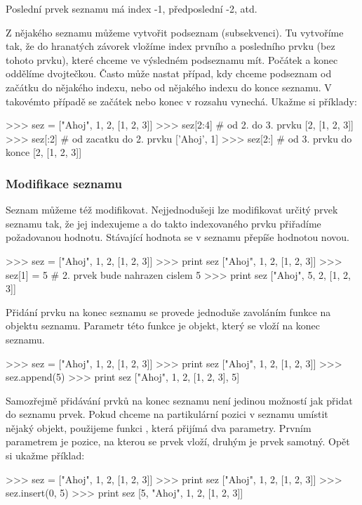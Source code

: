 Poslední prvek seznamu má index -1, předposlední -2, atd.

Z nějakého seznamu můžeme vytvořit podseznam (subsekvenci). Tu vytvoříme tak, že do hranatých závorek vložíme index prvního a posledního prvku (bez tohoto prvku), které chceme ve výsledném podseznamu mít. Počátek a konec oddělíme dvojtečkou. Často může nastat případ, kdy chceme podseznam od začátku do nějakého indexu, nebo od nějakého indexu do konce seznamu. V takovémto případě se začátek nebo konec v rozsahu vynechá. Ukažme si příklady:

\begin{python}
>>> sez = ["Ahoj", 1, 2, [1, 2, 3]]
>>> sez[2:4] # od 2. do 3. prvku
[2, [1, 2, 3]]
>>> sez[:2] # od zacatku do 2. prvku
['Ahoj', 1]
>>> sez[2:] # od 3. prvku do konce
[2, [1, 2, 3]]
\end{python}

\subsubsection{Modifikace seznamu}
Seznam můžeme též modifikovat. Nejjednodušeji lze modifikovat určitý prvek seznamu tak, že jej indexujeme a do takto indexovaného prvku přiřadíme požadovanou hodnotu. Stávající hodnota se v seznamu přepíše hodnotou novou.

\begin{python}
>>> sez = ["Ahoj", 1, 2, [1, 2, 3]]
>>> print sez
["Ahoj", 1, 2, [1, 2, 3]]
>>> sez[1] = 5 # 2. prvek bude nahrazen cislem 5
>>> print sez
["Ahoj", 5, 2, [1, 2, 3]]
\end{python}

Přidání prvku na konec seznamu se provede jednoduše zavoláním funk\-ce  na objektu seznamu. Parametr této funkce je objekt, který se vloží na konec seznamu.

\begin{python}
>>> sez = ["Ahoj", 1, 2, [1, 2, 3]]
>>> print sez
["Ahoj", 1, 2, [1, 2, 3]]
>>> sez.append(5)
>>> print sez
["Ahoj", 1, 2, [1, 2, 3], 5]
\end{python}

Samozřejmě přidávání prvků na konec seznamu není jedinou možností jak přidat do seznamu prvek. Pokud chceme na partikulární pozici v seznamu umístit nějaký objekt, použijeme funkci , která přijímá dva parametry. Prvním parametrem je pozice, na kterou se prvek vloží, druhým je prvek samotný. Opět si ukažme příklad:

\begin{python}
>>> sez = ["Ahoj", 1, 2, [1, 2, 3]]
>>> print sez
["Ahoj", 1, 2, [1, 2, 3]]
>>> sez.insert(0, 5)
>>> print sez
[5, "Ahoj", 1, 2, [1, 2, 3]]
\end{python}

